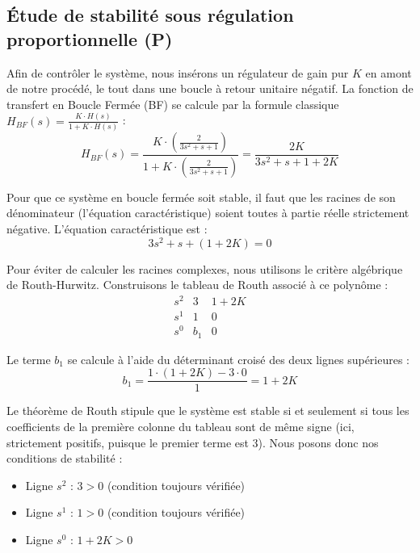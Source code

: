 \documentclass[11pt,a4paper]{article}
\begin{document}
\subsection{Étude de stabilité sous régulation proportionnelle (P)}

Afin de contrôler le système, nous insérons un régulateur de gain pur $K$ en amont de notre procédé, le tout dans une boucle à retour unitaire négatif. La fonction de transfert en Boucle Fermée (BF) se calcule par la formule classique $H_{BF}(s) = \frac{K \cdot H(s)}{1 + K \cdot H(s)}$ :
\begin{equation}
    H_{BF}(s) = \frac{K \cdot \left(\frac{2}{3s^2 + s + 1}\right)}{1 + K \cdot \left(\frac{2}{3s^2 + s + 1}\right)} = \frac{2K}{3s^2 + s + 1 + 2K}
\end{equation}

Pour que ce système en boucle fermée soit stable, il faut que les racines de son dénominateur (l'équation caractéristique) soient toutes à partie réelle strictement négative. L'équation caractéristique est :
\begin{equation}
    3s^2 + s + (1 + 2K) = 0
\end{equation}

Pour éviter de calculer les racines complexes, nous utilisons le critère algébrique de Routh-Hurwitz. Construisons le tableau de Routh associé à ce polynôme :
\begin{equation}
    \begin{array}{c|cc}
    s^2 & 3 & 1+2K \\
    s^1 & 1 & 0 \\
    s^0 & b_1 & 0
    \end{array}
\end{equation}

Le terme $b_1$ se calcule à l'aide du déterminant croisé des deux lignes supérieures :
\begin{equation}
    b_1 = \frac{1 \cdot (1+2K) - 3 \cdot 0}{1} = 1 + 2K
\end{equation}

Le théorème de Routh stipule que le système est stable si et seulement si tous les coefficients de la première colonne du tableau sont de même signe (ici, strictement positifs, puisque le premier terme est 3). Nous posons donc nos conditions de stabilité :
\begin{itemize}
    \item Ligne $s^2$ : $3 > 0$ (condition toujours vérifiée)
    \item Ligne $s^1$ : $1 > 0$ (condition toujours vérifiée)
    \item Ligne $s^0$ : $1 + 2K > 0$
\end{itemize}
\end{document}
